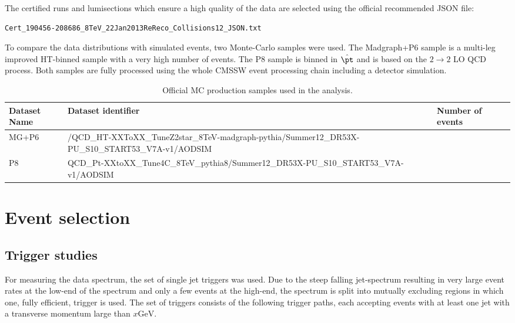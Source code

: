The certified runs and lumisections which ensure a high quality of the data are selected using the official
recommended JSON file:

\begin{verbatim}
Cert_190456-208686_8TeV_22Jan2013ReReco_Collisions12_JSON.txt
\end{verbatim}

To compare the data distributions with simulated events, two Monte-Carlo samples were used.
The Madgraph+P6 sample is a multi-leg improved HT-binned sample with a very high number of events. 
The P8 sample is binned in $\hat \pt$ and is based on the $2 \rightarrow 2$ LO QCD process. Both samples
are fully processed using the whole CMSSW event processing chain including a detector simulation.

\begin{table}[htbp]
    \centering
    \begin{tabular}{llll}
    \hline\hline
    Dataset Name & Dataset identifier & Number of events\\\hline
    MG+P6 & /QCD\_HT-XXToXX\_TuneZ2star\_8TeV-madgraph-pythia/Summer12\_DR53X-PU\_S10\_START53\_V7A-v1/AODSIM & \\
    P8 & QCD\_Pt-XXtoXX\_Tune4C\_8TeV\_pythia8/Summer12\_DR53X-PU\_S10\_START53\_V7A-v1/AODSIM & \\
    \hline\hline
    \end{tabular}
    \caption{Official MC production samples used in the analysis.}
    \label{tab:datasets}
\end{table}


\section{Event selection}

\subsection{Trigger studies}

For measuring the data spectrum, the set of single jet triggers was used. Due to
the steep falling jet-\pt spectrum resulting in very large event rates at the
low-\pt end of the spectrum and only a few events at the high-\pt end, the
spectrum is split into mutually excluding regions in which one, fully efficient,
trigger is used. The set of triggers consists of the following trigger paths,
each accepting events with at least one jet with a transverse momentum  large
than $x \si{\GeV}$.

